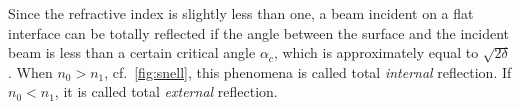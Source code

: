 \documentclass[10pt,twoside, b5paper,pdftex]{report}
\begin{document}
Since the refractive index is slightly less than one, a beam incident on a flat interface can be totally reflected if the angle between the surface and the incident beam is less than a certain critical angle $\alpha_c$, which is approximately equal to $\sqrt{2\delta}$. When $n_0 > n_1$, cf.~\cref{fig:snell}, this phenomena is called total {\it internal} reflection. If $n_0 < n_1$, it is called total {\it external} reflection.



\end{document}
